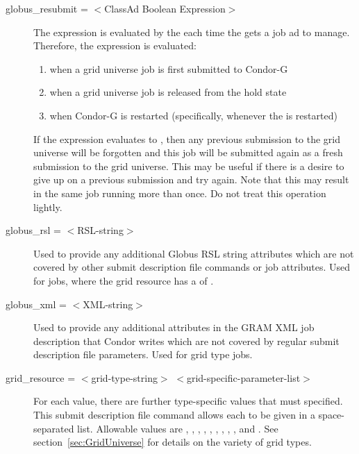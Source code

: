 \begin{description}
\label{condor-submit-globus-resubmit}
\item[globus\_resubmit = $<$ClassAd Boolean Expression$>$]
The expression is evaluated by the  each time
the  gets a job ad to manage.
Therefore, the expression is evaluated:
\begin{enumerate}
\item
   when a grid universe job is first submitted to Condor-G
\item
   when a grid universe job is released from the hold state
\item
   when Condor-G is restarted (specifically, whenever the 
   is restarted)
\end{enumerate}
If the expression evaluates to ,
then any previous submission to the grid universe will be
forgotten and this job will be submitted again as a fresh submission to
the grid universe.
This may be useful if there is a desire to give up on a
previous submission and try again.
Note that this may result in the same job running more than
once.  Do not treat this operation lightly.


\item[globus\_rsl = $<$RSL-string$>$]
Used to provide any additional Globus RSL
string attributes which are not covered by other submit description
file commands or job attributes. Used for  
jobs, where the grid resource has a  of
.


\item[globus\_xml = $<$XML-string$>$]
Used to provide any additional attributes in the GRAM XML job description
that Condor writes which are not covered by regular submit description
file parameters. Used for grid type  jobs.

\item[grid\_resource = $<$grid-type-string$>$ $<$grid-specific-parameter-list$>$ ]
For each  value, 
there are further type-specific values that must specified.
This submit description file command allows each to
be given in a space-separated list.
Allowable  values are
, , , 
, , ,
, , ,
and .
See section~\ref{sec:GridUniverse} for details on the variety of 
grid types.


\end{description}

